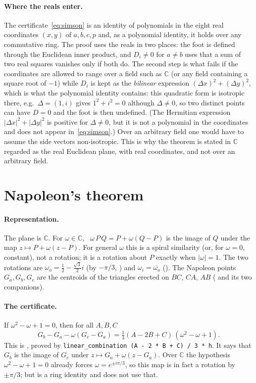 \documentclass[11pt]{article}
\theoremstyle{definition}
\theoremstyle{remark}
\newcommand{\lean}[1]{\texttt{#1}}
\newcommand{\CC}{\mathbb{C}}
\begin{document}
\paragraph{Where the reals enter.} The certificate~\eqref{eq:simson} is an identity of
polynomials in the eight real coordinates $(x,y)$ of $a,b,c,p$ and, as a polynomial identity, it
holds over any commutative ring. The proof uses the reals in two places: the foot is defined
through the Euclidean inner product, and $D_i\ne0$ for $a\ne b$ uses that a sum of two real
squares vanishes only if both do. The second step is what fails if the coordinates are allowed to
range over a field such as $\CC$ (or any field containing a square root of $-1$) while $D_i$ is
kept as the \emph{bilinear} expression $(\Delta x)^2+(\Delta y)^2$, which is what the polynomial
identity contains: this quadratic form is isotropic there, e.g.\ $\Delta=(1,i)$ gives
$1^2+i^2=0$ although $\Delta\ne0$, so two distinct points can have $D=0$ and the foot is then
undefined. (The Hermitian expression $|\Delta x|^2+|\Delta y|^2$ is positive for $\Delta\ne0$, but
it is not a polynomial in the coordinates and does not appear in~\eqref{eq:simson}.) Over an
arbitrary field one would have to assume the side vectors non-isotropic. This is why the theorem
is stated in $\CC$ regarded as the real Euclidean plane, with real coordinates, and not over an
arbitrary field.

\section{Napoleon's theorem}\label{sec:napoleon}

\paragraph{Representation.} The plane is $\CC$. For $\omega\in\CC$, ~$\omega\,P\,Q
=P+\omega(Q-P)$ is the image of $Q$ under the map $z\mapsto P+\omega(z-P)$. For general $\omega$
this is a spiral similarity (or, for $\omega=0$, constant), not a rotation; it is a rotation about
$P$ exactly when $|\omega|=1$.
The two rotations are $\omega_o=\tfrac12-\tfrac{\sqrt3}2 i$ (by $-\pi/3$, ) and
$\omega_i=\overline{\omega_o}$ (). The Napoleon points $G_a,G_b,G_c$ are the
centroids of the triangles erected on $BC$, $CA$, $AB$ ( and its two
companions).

\paragraph{The certificate.} If $\omega^2-\omega+1=0$, then for all $A,B,C$
\begin{equation}\label{eq:nap}
G_b-G_a-\omega(G_c-G_a)=\tfrac13(A-2B+C)\,(\omega^2-\omega+1).
\end{equation}
This is , proved by \lean{linear\_combination (A - 2 * B + C) / 3 * h}. It says that
$G_b$ is the image of $G_c$ under $z\mapsto G_a+\omega(z-G_a)$. Over $\CC$ the hypothesis
$\omega^2-\omega+1=0$ already forces $\omega=e^{\pm i\pi/3}$, so this map is in fact a rotation by
$\pm\pi/3$; but  is a ring identity and does not use that.
\end{document}
